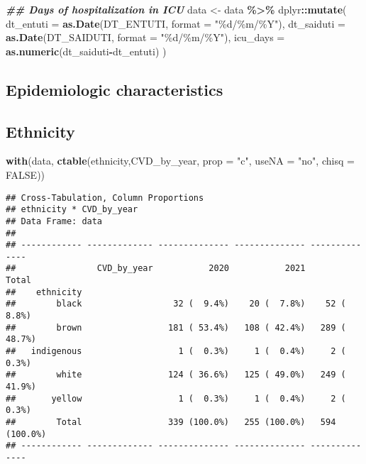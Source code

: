 \documentclass[
]{article}
\newenvironment{Shaded}{\begin{snugshade}}{\end{snugshade}}
\newcommand{\AttributeTok}[1]{\textcolor[rgb]{0.13,0.29,0.53}{#1}}
\newcommand{\ConstantTok}[1]{\textcolor[rgb]{0.56,0.35,0.01}{#1}}
\newcommand{\DocumentationTok}[1]{\textcolor[rgb]{0.56,0.35,0.01}{\textbf{\textit{#1}}}}
\newcommand{\FunctionTok}[1]{\textcolor[rgb]{0.13,0.29,0.53}{\textbf{#1}}}
\newcommand{\NormalTok}[1]{#1}
\newcommand{\OtherTok}[1]{\textcolor[rgb]{0.56,0.35,0.01}{#1}}
\newcommand{\SpecialCharTok}[1]{\textcolor[rgb]{0.81,0.36,0.00}{\textbf{#1}}}
\newcommand{\StringTok}[1]{\textcolor[rgb]{0.31,0.60,0.02}{#1}}
\begin{document}
\begin{Shaded}
\begin{Highlighting}[]
\DocumentationTok{\#\# Days of hospitalization in ICU}
\NormalTok{data }\OtherTok{\textless{}{-}}\NormalTok{ data }\SpecialCharTok{\%\textgreater{}\%}
\NormalTok{   dplyr}\SpecialCharTok{::}\FunctionTok{mutate}\NormalTok{(}
    \AttributeTok{dt\_entuti =} \FunctionTok{as.Date}\NormalTok{(DT\_ENTUTI, }\AttributeTok{format =} \StringTok{"\%d/\%m/\%Y"}\NormalTok{),}
    \AttributeTok{dt\_saiduti =} \FunctionTok{as.Date}\NormalTok{(DT\_SAIDUTI, }\AttributeTok{format =} \StringTok{"\%d/\%m/\%Y"}\NormalTok{),}
    \AttributeTok{icu\_days =} \FunctionTok{as.numeric}\NormalTok{(dt\_saiduti}\SpecialCharTok{{-}}\NormalTok{dt\_entuti)}
\NormalTok{)}
\end{Highlighting}
\end{Shaded}

\hypertarget{epidemiologic-characteristics}{%
\subsection{Epidemiologic
characteristics}\label{epidemiologic-characteristics}}

\hypertarget{ethnicity}{%
\subsection{Ethnicity}\label{ethnicity}}

\begin{Shaded}
\begin{Highlighting}[]
\FunctionTok{with}\NormalTok{(data, }\FunctionTok{ctable}\NormalTok{(ethnicity,CVD\_by\_year, }\AttributeTok{prop =} \StringTok{"c"}\NormalTok{, }\AttributeTok{useNA =} \StringTok{"no"}\NormalTok{, }\AttributeTok{chisq =} \ConstantTok{FALSE}\NormalTok{))}
\end{Highlighting}
\end{Shaded}

\begin{verbatim}
## Cross-Tabulation, Column Proportions  
## ethnicity * CVD_by_year  
## Data Frame: data  
## 
## ------------ ------------- -------------- -------------- --------------
##                CVD_by_year           2020           2021          Total
##    ethnicity                                                           
##        black                  32 (  9.4%)    20 (  7.8%)    52 (  8.8%)
##        brown                 181 ( 53.4%)   108 ( 42.4%)   289 ( 48.7%)
##   indigenous                   1 (  0.3%)     1 (  0.4%)     2 (  0.3%)
##        white                 124 ( 36.6%)   125 ( 49.0%)   249 ( 41.9%)
##       yellow                   1 (  0.3%)     1 (  0.4%)     2 (  0.3%)
##        Total                 339 (100.0%)   255 (100.0%)   594 (100.0%)
## ------------ ------------- -------------- -------------- --------------
\end{verbatim}
\end{document}

